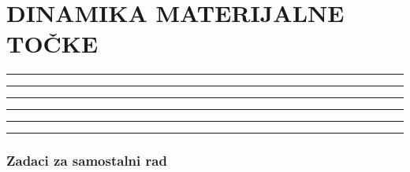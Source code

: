 \documentclass[10pt]{book}
\newcounter{zadatak} %
\newcounter{cjelina}
\begin{document}
\setcounter{zadatak}{0}

\newpage
\chapter{DINAMIKA MATERIJALNE TOČKE}



{\color{boja} \rule{\linewidth}{0.3mm} }

\vspace{0.2cm} 




{\color{boja} \rule{\linewidth}{0.3mm} }

\vspace{0.2cm}





{\color{boja} \rule{\linewidth}{0.3mm} }






{\color{boja} \rule{\linewidth}{0.3mm} }

\vspace{0.2cm} 




{\color{boja} \rule{\linewidth}{0.3mm} }

\vspace{0.2cm}





{\color{boja} \rule{\linewidth}{0.3mm} }


\subsection*{Zadaci za samostalni rad}



\vspace{0.2cm}


\vspace{0.2cm}
\end{document}
